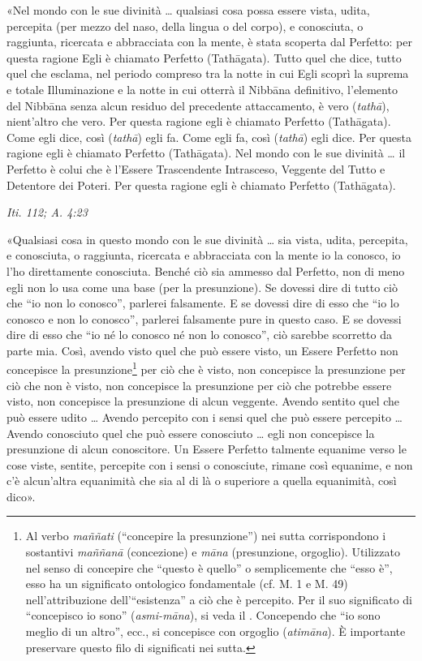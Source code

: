 «Nel mondo con le sue divinità … qualsiasi cosa possa essere vista,
udita, percepita (per mezzo del naso, della lingua o del corpo), e
conosciuta, o raggiunta, ricercata e abbracciata con la mente, è stata
scoperta dal Perfetto: per questa ragione Egli è chiamato Perfetto
(Tathāgata). Tutto quel che dice, tutto quel che esclama, nel periodo
compreso tra la notte in cui Egli scoprì la suprema e totale
Illuminazione e la notte in cui otterrà il Nibbāna definitivo,
l’elemento del Nibbāna senza alcun residuo del precedente attaccamento,
è vero (\emph{tathā}), nient’altro che vero. Per questa ragione egli è
chiamato Perfetto (Tathāgata). Come egli dice, così (\emph{tathā}) egli fa.
Come egli fa, così (\emph{tathā}) egli dice. Per questa ragione egli è
chiamato Perfetto (Tathāgata). Nel mondo con le sue divinità … il
Perfetto è colui che è l’Essere Trascendente Intrasceso, Veggente del
Tutto e Detentore dei Poteri. Per questa ragione egli è chiamato
Perfetto (Tathāgata).


\emph{Iti. 112; A. 4:23}


«Qualsiasi cosa in questo mondo con le sue divinità … sia vista, udita,
percepita, e conosciuta, o raggiunta, ricercata e abbracciata con la
mente io la conosco, io l’ho direttamente conosciuta. Benché ciò sia
ammesso dal Perfetto, non di meno egli non lo usa come una base (per la
presunzione). Se dovessi dire di tutto ciò che “io non lo conosco”,
parlerei falsamente. E se dovessi dire di esso che “io lo conosco e non
lo conosco”, parlerei falsamente pure in questo caso. E se dovessi dire
di esso che “io né lo conosco né non lo conosco”, ciò sarebbe scorretto
da parte mia. Così, avendo visto quel che può essere visto, un Essere
Perfetto non concepisce la presunzione\footnote{Al verbo \emph{maññati} (“concepire la presunzione”) nei sutta corrispondono i sostantivi \emph{maññanā} (concezione) e \emph{māna} (presunzione, orgoglio). Utilizzato nel senso di concepire che “questo è quello” o semplicemente che “esso è”, esso ha un significato ontologico fondamentale (cf. M. 1 e M. 49) nell’attribuzione dell’“esistenza” a ciò che è percepito. Per il suo significato di “concepisco io sono” (\emph{asmi-māna}), si veda il \hyperlink{cap-12-La-Dottrina#pag259}{}. Concependo che “io sono meglio di un altro”, ecc., si concepisce con orgoglio (\emph{atimāna}). È importante preservare questo filo di significati nei sutta.}  per ciò che è
visto, non concepisce la presunzione per ciò che non è visto, non
concepisce la presunzione per ciò che potrebbe essere visto, non
concepisce la presunzione di alcun veggente. Avendo sentito quel che può
essere udito … Avendo percepito con i sensi quel che può essere
percepito … Avendo conosciuto quel che può essere conosciuto … egli non
concepisce la presunzione di alcun conoscitore. Un Essere Perfetto
talmente equanime verso le cose viste, sentite, percepite con i sensi o
conosciute, rimane così equanime, e non c’è alcun’altra equanimità che
sia al di là o superiore a quella equanimità, così dico».


